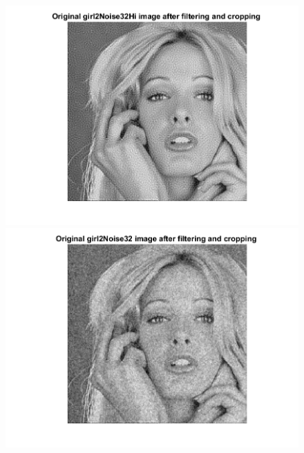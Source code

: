 \documentclass[11pt]{article} %
\begin{document}
\begin{figure}
 \centering
	\includegraphics{2de.png}
	\includegraphics{2df.png}
\end{figure}
\end{document}

